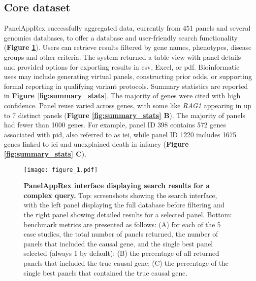 \subsection{Core dataset}
PanelAppRex successfully aggregated data, currently from 451 panels and several genomics databases, to offer a database and user-friendly search functionality (\textbf{Figure \ref{fig:performance}}).
Users can retrieve results filtered by gene names, phenotypes, disease groups and other criteria. 
The system returned a table view with panel details and provided options for exporting results in \ac{csv}, Excel, or \ac{pdf}.
Bioinformatic uses may include generating virtual panels, constructing prior odds, or supporting formal reporting in qualifying variant protocols.
Summary statistics are reported in 
\textbf{Figure \ref{fig:summary_stats}}. The majority of genes were cited with high confidence. 
Panel reuse varied across genes, with some like \textit{RAG1} appearing in up to 7 distinct panels 
(\textbf{Figure \ref{fig:summary_stats} B}). 
The majority of panels had fewer than 1000 genes.
For example, panel ID 398 contains 572 genes associated with \ac{pid}, also referred to as \ac{iei}, while panel ID 1220 includes 1675 genes linked to \ac{iei} and unexplained death in infancy 
(\textbf{Figure \ref{fig:summary_stats} C}).

\begin{figure}[ht]
    \centering
    \texttt{[image: figure\_1.pdf]}    
\caption{\textbf{PanelAppRex interface displaying search results for a complex query.} Top: screenshots showing the search interface, with the left panel displaying the full database before filtering and the right panel showing detailed results for a selected panel. Bottom: benchmark metrics are presented as follows: (A) for each of the 5 case studies, the total number of panels returned, the number of panels that included the causal gene, and the single best panel selected (always 1 by default); (B) the percentage of all returned panels that included the true causal gene; (C) the percentage of the single best panels that contained the true causal gene.}
    \label{fig:performance}
\end{figure}





